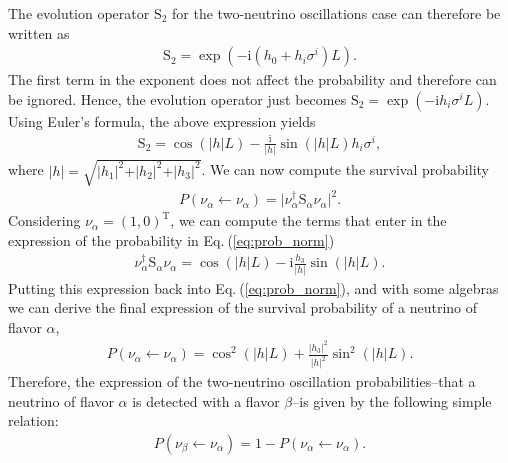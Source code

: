 \documentclass[twocolumn,secnumarabic,amssymb, nobibnotes, aps, prd,10pt]{revtex4-1}
\newcommand{\Eq}[1]{Eq.$\:$(\ref{#1})}
\begin{document}
The evolution operator $\mathrm{S}_2$ for the two-neutrino oscillations case can
therefore be written as
\begin{align}
\mathrm{S}_2 = \exp \left( - \mathrm{i} (h_0 + h_i \sigma^i) L \right).
\end{align}
The first term in the exponent does not affect the probability and therefore can be 
ignored. Hence, the evolution operator just becomes $\mathrm{S}_2 = \exp (- \mathrm{i}
h_i \sigma^i L)$. Using Euler's formula, the above expression yields
\begin{align}
\mathrm{S}_2 = \cos (\vert h \vert L) -  \frac{\mathrm{i}}
{\vert h \vert} \sin (\vert h \vert L) h_i \sigma^i ,
\end{align}
where $\vert h \vert = \sqrt{ \vert h_1 \vert^2 + \vert h_2 \vert^2 +
\vert h_3 \vert^2}$. We can now compute the survival probability 
\begin{align}
P (\nu_\alpha \longleftarrow \nu_\alpha) = \vert \nu_\alpha^\dagger \mathrm{S}_\alpha
\nu_\alpha \vert^2 .
\label{eq:prob_norm}
\end{align} 
Considering $\nu_\alpha = (1,0)^\mathrm{T}$, we can compute the terms that enter in the
expression of the probability in \Eq{eq:prob_norm}
\begin{align}
\nu_\alpha^\dagger \mathrm{S}_\alpha \nu_\alpha = \cos (\vert h \vert L) - \mathrm{i}
\frac{h_3}{\vert h \vert} \sin (\vert h \vert L).
\end{align}
Putting this expression back into \Eq{eq:prob_norm}, and with some algebras we can
derive the final expression of the survival probability of a neutrino of flavor $\alpha$,
\begin{align}
P (\nu_\alpha \longleftarrow \nu_\alpha) =  \cos^2 (\vert h \vert L) +
\frac{\vert h_3 \vert^2 }{\vert h \vert^2} \sin^2 (\vert h \vert L).
\end{align}
Therefore, the expression of the two-neutrino oscillation probabilities--that a neutrino
of flavor $\alpha$ is detected with a flavor $\beta$--is given by the following simple
relation:
\begin{align}
P (\nu_\beta \longleftarrow \nu_\alpha) = 1 - P (\nu_\alpha \longleftarrow \nu_\alpha).
\end{align}
\end{document}

